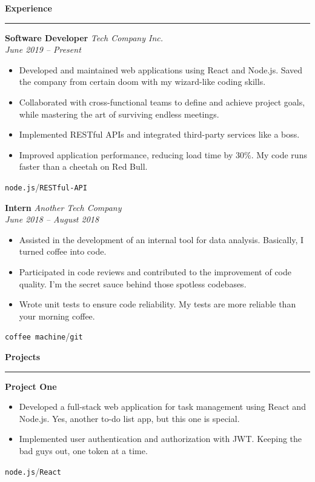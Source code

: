 \documentclass[a4paper,11pt]{article}
\newcommand{\sectiontitle}[1]{\textbf{\Large #1}\par\vspace{-1em}\noindent\rule{\linewidth}{0.3mm}\par\vspace{0.3em}}
\newcommand{\slashsep}{\hspace{3mm}/\hspace{3mm}}
\begin{document}
\begin{minipage}[t]{0.7\textwidth-0.5\columnsep}
	\vspace{1em}

	\sectiontitle{Experience}

	\textbf{\large Software Developer} \hfill \textit{Tech Company Inc.}\\
	\textit{June 2019 -- Present}
	\begin{itemize}
		\item Developed and maintained web applications using React and Node.js. Saved the company from certain doom with my wizard-like coding skills.
		\item Collaborated with cross-functional teams to define and achieve project goals, while mastering the art of surviving endless meetings.
		\item Implemented RESTful APIs and integrated third-party services like a boss.
		\item Improved application performance, reducing load time by 30\%. My code runs faster than a cheetah on Red Bull.
	\end{itemize}
	\texttt{node.js}\slashsep\texttt{RESTful-API}
	\vspace{0.5em}

	\textbf{\large Intern} \hfill \textit{Another Tech Company}\\
	\textit{June 2018 -- August 2018}
	\begin{itemize}
		\item Assisted in the development of an internal tool for data analysis. Basically, I turned coffee into code.
		\item Participated in code reviews and contributed to the improvement of code quality. I'm the secret sauce behind those spotless codebases.
		\item Wrote unit tests to ensure code reliability. My tests are more reliable than your morning coffee.
	\end{itemize}
	\texttt{coffee machine}\slashsep\texttt{git}

	\vspace{1em}

	\sectiontitle{Projects}

	\textbf{\large Project One}
	\begin{itemize}
		\item Developed a full-stack web application for task management using React and Node.js. Yes, another to-do list app, but this one is special.
		\item Implemented user authentication and authorization with JWT. Keeping the bad guys out, one token at a time.
	\end{itemize}
	\texttt{node.js}\slashsep\texttt{React}
	\vspace{0.5em}


\end{minipage}
\end{document}
